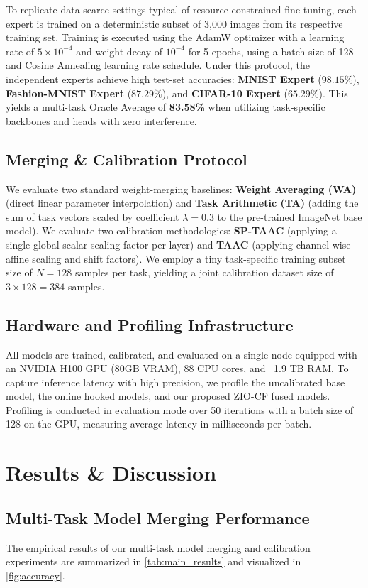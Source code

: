\documentclass{article}
\begin{document}
To replicate data-scarce settings typical of resource-constrained fine-tuning, each expert is trained on a deterministic subset of 3,000 images from its respective training set. Training is executed using the AdamW optimizer \cite{loshchilov2017decoupled} with a learning rate of $5 \times 10^{-4}$ and weight decay of $10^{-4}$ for 5 epochs, using a batch size of 128 and Cosine Annealing learning rate schedule. Under this protocol, the independent experts achieve high test-set accuracies: \textbf{MNIST Expert} ($98.15\%$), \textbf{Fashion-MNIST Expert} ($87.29\%$), and \textbf{CIFAR-10 Expert} ($65.29\%$). This yields a multi-task Oracle Average of \textbf{83.58\%} when utilizing task-specific backbones and heads with zero interference.

\subsection{Merging \& Calibration Protocol}
We evaluate two standard weight-merging baselines: \textbf{Weight Averaging (WA)} (direct linear parameter interpolation) and \textbf{Task Arithmetic (TA)} (adding the sum of task vectors scaled by coefficient $\lambda = 0.3$ to the pre-trained ImageNet base model). We evaluate two calibration methodologies: \textbf{SP-TAAC} (applying a single global scalar scaling factor per layer) and \textbf{TAAC} (applying channel-wise affine scaling and shift factors). We employ a tiny task-specific training subset size of $N=128$ samples per task, yielding a joint calibration dataset size of $3 \times 128 = 384$ samples.

\subsection{Hardware and Profiling Infrastructure}
All models are trained, calibrated, and evaluated on a single node equipped with an NVIDIA H100 GPU (80GB VRAM), 88 CPU cores, and ~1.9 TB RAM.
To capture inference latency with high precision, we profile the uncalibrated base model, the online hooked models, and our proposed ZIO-CF fused models. Profiling is conducted in evaluation mode over 50 iterations with a batch size of 128 on the GPU, measuring average latency in milliseconds per batch.

\section{Results \& Discussion}

\subsection{Multi-Task Model Merging Performance}
The empirical results of our multi-task model merging and calibration experiments are summarized in \cref{tab:main_results} and visualized in \cref{fig:accuracy}.
\end{document}
